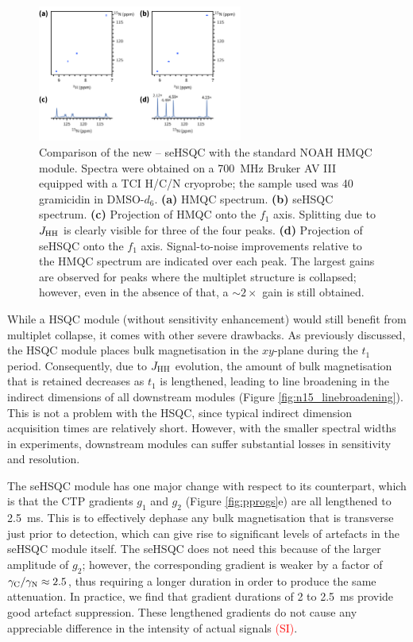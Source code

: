 \documentclass[11pt]{article}
\newcommand*{\carbon}{\ce{^{13}C}}
\newcommand*{\proton}{\ce{^{1}H}}
\newcommand*{\nitrogen}{\ce{^{15}N}}
\newcommand*{\red}[1]{\textcolor{red}{#1}}
\newcommand*{\jhh}{J_{\ce{HH}}}
\newcommand*{\figref}[1]{Figure \ref{fig:#1}}
\newcommand*{\sitodo}{\red{(SI)}}
\newcommand*{\grami}{Spectra were obtained on a \SI{700}{\MHz} Bruker AV III equipped with a TCI H/C/N cryoprobe; the sample used was \SI{40}{\milli\molar} gramicidin in DMSO-$d_6$.}
\begin{document}
\begin{figure}[H]
    \centering
    \includegraphics[width=0.6\textwidth]{./figures/15n_spv2vsm.png}
    \caption{
        Comparison of the new \nitrogen{}--\proton{} seHSQC with the standard NOAH HMQC module.
        \grami{}
        \textbf{(a)} HMQC spectrum.
        \textbf{(b)} seHSQC spectrum.
        \textbf{(c)} Projection of HMQC onto the $f_1$ axis.
        Splitting due to $\jhh$ is clearly visible for three of the four peaks.
        \textbf{(d)} Projection of seHSQC onto the $f_1$ axis.
        Signal-to-noise improvements relative to the HMQC spectrum are indicated over each peak.
        The largest gains are observed for peaks where the multiplet structure is collapsed; however, even in the absence of that, a $\sim 2\times$ gain is still obtained.
    }
    \label{fig:n15}
\end{figure}

While a \nitrogen{} HSQC module (without sensitivity enhancement) would still benefit from multiplet collapse, it comes with other severe drawbacks.
As previously discussed, the HSQC module places bulk magnetisation in the $xy$-plane during the $t_1$ period.
Consequently, due to $\jhh$ evolution, the amount of bulk magnetisation that is retained decreases as $t_1$ is lengthened, leading to line broadening in the indirect dimensions of all downstream modules (\figref{n15_linebroadening}).
This is not a problem with the \carbon{} HSQC, since typical \carbon{} indirect dimension acquisition times are relatively short.
However, with the smaller spectral widths in \nitrogen{} experiments, downstream modules can suffer substantial losses in sensitivity and resolution.

The \nitrogen{} seHSQC module has one major change with respect to its \carbon{} counterpart, which is that the CTP gradients $g_1$ and $g_2$ (\figref{pprogs}e) are all lengthened to \SI{2.5}{\ms}.
This is to effectively dephase any bulk magnetisation that is transverse just prior to detection, which can give rise to significant levels of artefacts in the seHSQC module itself.
The \carbon{} seHSQC does not need this because of the larger amplitude of $g_2$; however, the corresponding \nitrogen{} gradient is weaker by a factor of $\gamma_{\ce{C}}/\gamma_{\ce{N}} \approx 2.5$, thus requiring a longer duration in order to produce the same attenuation.
In practice, we find that gradient durations of 2 to \SI{2.5}{\ms} provide good artefact suppression.
These lengthened gradients do not cause any appreciable difference in the intensity of actual signals \sitodo{}.
\end{document}
